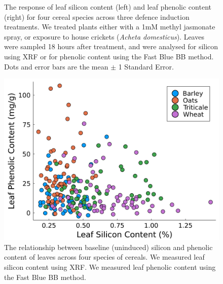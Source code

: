 \documentclass[12pt, letterpaper, ]{report}
\begin{document}
\begin{figure}[h]
\begin{subfigure}[b]{0.49\textwidth}
        \end{subfigure}
        \caption{The response of leaf silicon content (left) and leaf phenolic content (right) for four cereal species across three defence induction treatments. We treated plants either with a 1mM methyl jasmonate spray, or exposure to house crickets (\textit{Acheta domesticus}). Leaves were sampled 18 hours after treatment, and were analysed for silicon using XRF or for phenolic content using the Fast Blue BB method. Dots and error bars are the mean $\pm$ 1 Standard Error.}
        \label{Fig:induction}
\end{figure}



\begin{figure}[h]
        \includegraphics[width = \textwidth]{images/phenolic_silicon_regression.png}
        \centering
        \caption{The relationship between baseline (uninduced) silicon and phenolic content of leaves across four species of cereals. We measured leaf silicon content using XRF. We measured leaf phenolic content using the Fast Blue BB method.}
        \label{Fig:phe_si_scatter}
\end{figure}
\clearpage
\end{document}
